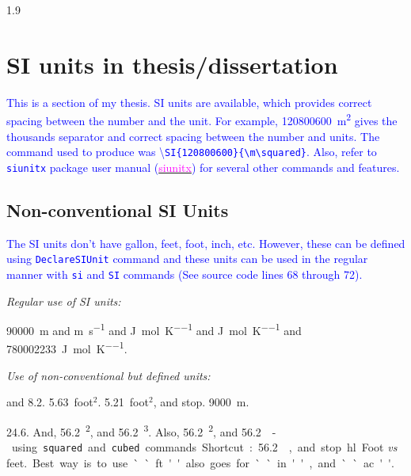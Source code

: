 \documentclass[phd]{ndsu-thesis-2022}
\newcommand\myspacing{1.9} %
\newcommand\italk[1]{\textcolor{blue}{#1}}  %
\newcommand{\sqft}[1]{\SI{#1}{foot}$^2$\xspace}%
\newcommand{\cuft}[1]{\SI{#1}{\cubic\ft}\xspace}%
\begin{document}
\begin{spacing}{\myspacing}

\section{SI units in thesis/dissertation}
\italk{This is a section of my thesis. SI units are available, which provides correct spacing between the number and the unit. For example, \SI{120800600}{\m\squared} gives the thousands separator and correct spacing between the number and units. The command used to produce was \textbackslash\texttt{SI\{120800600\}\{\textbackslash m\textbackslash squared\}}.  Also, refer to \texttt{siunitx} package user manual (\href{https://mirror.mwt.me/ctan/macros/latex/contrib/siunitx/siunitx.pdf}{\textcolor{magenta}{siunitx}}) for several other commands and features.} 

\subsection{Non-conventional SI Units}
\italk{The SI units don't have gallon, feet, foot, inch, etc. However, these can be defined using \texttt{DeclareSIUnit} command and these units can be used in the regular manner with \texttt{si} and \texttt{SI} commands (See source code lines 68 through 72).} 

\noindent\emph{Regular use of SI units:}

\SI{90000}{\m} and \unit{\m\per\s} and \unit{\joule\per\mole\per\kelvin} and \si{\joule\per\mole\per\kelvin} and \SI{780002233}{\joule\per\mole\per\kelvin}.

\noindent\emph{Use of non-conventional but defined units:}

\si{\gal}  and \SI{8.2}{\gal}. \SI{5.63}{foot}$^2$\xspace. \sqft{5.21}, and stop. \SI{9000}{\m}.

\SI{24.6}{\ft}. And, \SI{56.2}{\ft\tothe{2}}, and \SI{56.2}{\ft\tothe{3}}. Also, \SI{56.2}{\ft\squared}, and \SI{56.2}{\cubic\ft} - using \texttt{squared} and \texttt{cubed} commands. Shortcut: \cuft{56.2}, and stop.

\hl{Foot \emph{vs} feet.} Best way is to use ``ft'' also goes for ``in'', and ``ac''. 




\end{spacing}
\end{document}
